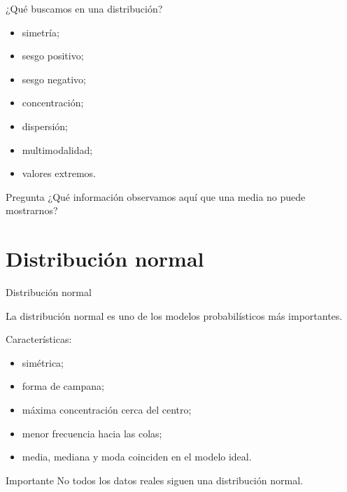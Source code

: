 \documentclass[aspectratio=169,11pt]{beamer}
\begin{document}
\begin{frame}{¿Qué buscamos en una distribución?}

\begin{itemize}

    \item simetría;

    \item sesgo positivo;

    \item sesgo negativo;

    \item concentración;

    \item dispersión;

    \item multimodalidad;

    \item valores extremos.

\end{itemize}

\vspace{0.4cm}

\begin{block}{Pregunta}
¿Qué información observamos aquí que una media no puede mostrarnos?
\end{block}

\end{frame}

\section{Distribución normal}

\begin{frame}{Distribución normal}

La distribución normal es uno de los modelos probabilísticos más importantes.

Características:

\begin{itemize}

    \item simétrica;

    \item forma de campana;

    \item máxima concentración cerca del centro;

    \item menor frecuencia hacia las colas;

    \item media, mediana y moda coinciden en el modelo ideal.

\end{itemize}

\begin{alertblock}{Importante}
No todos los datos reales siguen una distribución normal.
\end{alertblock}

\end{frame}
\end{document}
